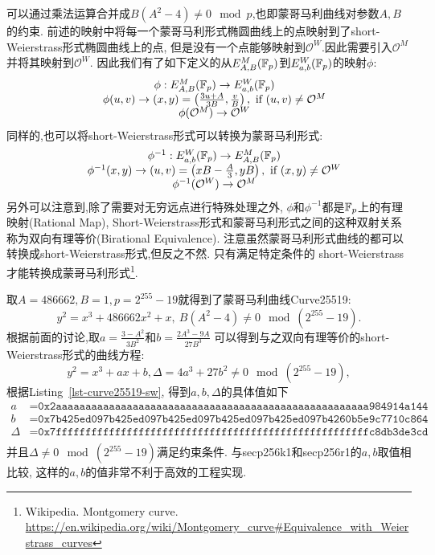 可以通过乘法运算合并成$B(A^2-4)\neq 0  \mod p$,也即蒙哥马利曲线对参数$A,B$的约束.
前述的映射中将每一个蒙哥马利形式椭圆曲线上的点映射到了short-Weierstrass形式椭圆曲线上的点,
但是没有一个点能够映射到$\mathcal{O}^W$.因此需要引入$\mathcal{O}^M$并将其映射到$\mathcal{O}^W$.
因此我们有了如下定义的从$E_{A,B}^M(\mathbb{F}_p)$到$E_{a,b}^{W}(\mathbb{F}_p)$的映射$\phi$:
\begin{equation*}
\begin{array}{cc}
& \phi: E_{A,B}^M(\mathbb{F}_p)   \rightarrow E_{a,b}^{W}(\mathbb{F}_p) \\
& \phi(u,v)   \rightarrow  (x,y) = \left( \frac{3u+A}{3B}, \frac{v}{B} \right),\ \text{if}\  (u,v)\neq \mathcal{O}^M \\
& \phi(\mathcal{O}^M) \rightarrow \mathcal{O}^W
\end{array}
\end{equation*}
同样的,也可以将short-Weierstrass形式可以转换为蒙哥马利形式:
\begin{equation*}
\begin{array}{cc}
&\phi^{-1}: E_{a,b}^{W}(\mathbb{F}_p)   \rightarrow  E_{A,B}^M(\mathbb{F}_p)\\
&\phi^{-1}(x, y)   \rightarrow (u,v) = \left(xB - \frac{A}{3}, yB\right),\ \text{if}\  (x, y)\neq \mathcal{O}^W \\
&\phi^{-1}(\mathcal{O}^W) \rightarrow \mathcal{O}^M
\end{array}
\end{equation*}
另外可以注意到,除了需要对无穷远点进行特殊处理之外, $\phi$和$\phi^{-1}$都是$\mathbb{F}_p$上的有理映射(Rational Map),
Short-Weierstrass形式和蒙哥马利形式之间的这种双射关系称为双向有理等价(Birational Equivalence).
注意虽然蒙哥马利形式曲线的都可以转换成short-Weierstrass形式,但反之不然.
只有满足特定条件的 short-Weierstrass 才能转换成蒙哥马利形式\footnote{
Wikipedia. Montgomery curve.
\url{https://en.wikipedia.org/wiki/Montgomery_curve\#Equivalence_with_Weierstrass_curves}}.

取$A = 486662, B = 1, p = 2^{255}-19$就得到了蒙哥马利曲线Curve25519:
$$
y^2 = x^3 + 486662x^2 + x,\  B(A^2-4)\neq 0 \mod (2^{255}-19).
$$
根据前面的讨论,取$a = \frac{3-A^2}{3B^2}$和$b = \frac{2A^3 - 9A}{27B^3}$
可以得到与之双向有理等价的short-Weierstrass形式的曲线方程:
$$
y^2 = x^3 + ax + b, \Delta = 4a^3 + 27b^2 \neq 0\mod (2^{255}-19),
$$
根据Listing~\ref{lst-curve25519-sw}, 得到$a,b,\Delta$的具体值如下
\begin{equation*}
\begin{array}{rl}
a & = \texttt{0x2aaaaaaaaaaaaaaaaaaaaaaaaaaaaaaaaaaaaaaaaaaaaaaaaaaaaa984914a144} \\
b & = \texttt{0x7b425ed097b425ed097b425ed097b425ed097b425ed097b4260b5e9c7710c864} \\
\Delta &= \texttt{0x7fffffffffffffffffffffffffffffffffffffffffffffffffffffc8db3de3cd}\\
\end{array}
\end{equation*}
并且$\Delta\neq 0\mod (2^{255}-19)$满足约束条件.
与secp256k1和secp256r1的$a,b$取值相比较, 这样的$a,b$的值非常不利于高效的工程实现.

